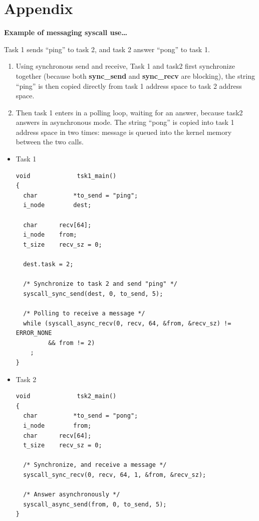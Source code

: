 %
%

\newpage

\section{Appendix}

\textbf{Example of messaging syscall use\ldots}

Task 1 sends ``ping'' to task 2, and task 2 answer ``pong'' to task 1.

\begin{enumerate}
  \item Using synchronous send and receive, Task 1 and task2 first
  synchronize together (because both \textbf{sync\_send} and
  \textbf{sync\_recv} are blocking), the string ``ping'' is then copied
  directly from task 1 address space to task 2 address space.

  \item	Then task 1 enters in a polling loop, waiting for an answer, because
  task2 answers in asynchronous mode. The string ``pong'' is copied into task 1
  address space in two times: message is queued into the kernel memory between
  the two calls.
\end{enumerate}

\begin{itemize}
  \item Task 1

\begin{verbatim}
void             tsk1_main()
{
  char          *to_send = "ping";
  i_node        dest;

  char		recv[64];
  i_node	from;
  t_size	recv_sz = 0;

  dest.task = 2;

  /* Synchronize to task 2 and send "ping" */
  syscall_sync_send(dest, 0, to_send, 5);

  /* Polling to receive a message */
  while (syscall_async_recv(0, recv, 64, &from, &recv_sz) != ERROR_NONE
         && from != 2)
    ;
}
\end{verbatim}

  \item Task 2

\begin{verbatim}
void             tsk2_main()
{
  char          *to_send = "pong";
  i_node        from;
  char		recv[64];
  t_size	recv_sz = 0;

  /* Synchronize, and receive a message */
  syscall_sync_recv(0, recv, 64, 1, &from, &recv_sz);

  /* Answer asynchronously */
  syscall_async_send(from, 0, to_send, 5);
}
\end{verbatim}

\end{itemize}
